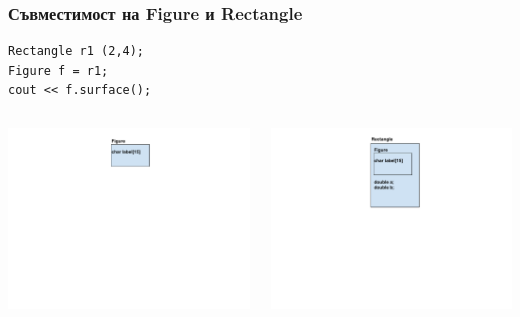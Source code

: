 \documentclass{beamer}
\begin{document}
\begin{frame}[fragile]
\frametitle{Съвместимост на Figure и Rectangle}


\begin{flushleft}
\begin{lstlisting}
Rectangle r1 (2,4);
Figure f = r1;
cout << f.surface();
\end{lstlisting}
\end{flushleft}



\begin{columns}[t]
  \hspace{-150px}
  \begin{column}{0.5\textwidth}
\begin{center}
\includegraphics[width=12.0cm]{images/inmem_figure}
\end{center}

  \end{column}
  \begin{column}{0.5\textwidth}
\begin{center}
  \hspace{-150px}
\includegraphics[width=12.0cm]{images/inmem_rectangle}
\end{center}


\end{column}
\end{columns}
\end{frame}
\end{document}
